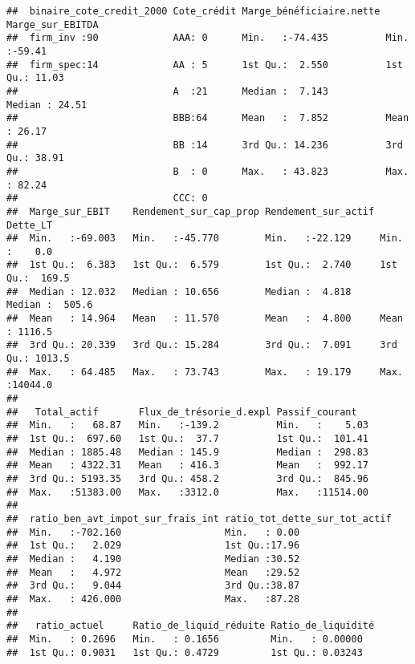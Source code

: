 \documentclass[
]{article}
\begin{document}
\begin{verbatim}
##  binaire_cote_credit_2000 Cote_crédit Marge_bénéficiaire.nette Marge_sur_EBITDA
##  firm_inv :90             AAA: 0      Min.   :-74.435          Min.   :-59.41  
##  firm_spec:14             AA : 5      1st Qu.:  2.550          1st Qu.: 11.03  
##                           A  :21      Median :  7.143          Median : 24.51  
##                           BBB:64      Mean   :  7.852          Mean   : 26.17  
##                           BB :14      3rd Qu.: 14.236          3rd Qu.: 38.91  
##                           B  : 0      Max.   : 43.823          Max.   : 82.24  
##                           CCC: 0                                               
##  Marge_sur_EBIT    Rendement_sur_cap_prop Rendement_sur_actif    Dette_LT      
##  Min.   :-69.003   Min.   :-45.770        Min.   :-22.129     Min.   :    0.0  
##  1st Qu.:  6.383   1st Qu.:  6.579        1st Qu.:  2.740     1st Qu.:  169.5  
##  Median : 12.032   Median : 10.656        Median :  4.818     Median :  505.6  
##  Mean   : 14.964   Mean   : 11.570        Mean   :  4.800     Mean   : 1116.5  
##  3rd Qu.: 20.339   3rd Qu.: 15.284        3rd Qu.:  7.091     3rd Qu.: 1013.5  
##  Max.   : 64.485   Max.   : 73.743        Max.   : 19.179     Max.   :14044.0  
##                                                                                
##   Total_actif       Flux_de_trésorie_d.expl Passif_courant    
##  Min.   :   68.87   Min.   :-139.2          Min.   :    5.03  
##  1st Qu.:  697.60   1st Qu.:  37.7          1st Qu.:  101.41  
##  Median : 1885.48   Median : 145.9          Median :  298.83  
##  Mean   : 4322.31   Mean   : 416.3          Mean   :  992.17  
##  3rd Qu.: 5193.35   3rd Qu.: 458.2          3rd Qu.:  845.96  
##  Max.   :51383.00   Max.   :3312.0          Max.   :11514.00  
##                                                               
##  ratio_ben_avt_impot_sur_frais_int ratio_tot_dette_sur_tot_actif
##  Min.   :-702.160                  Min.   : 0.00                
##  1st Qu.:   2.029                  1st Qu.:17.96                
##  Median :   4.190                  Median :30.52                
##  Mean   :   4.972                  Mean   :29.52                
##  3rd Qu.:   9.044                  3rd Qu.:38.87                
##  Max.   : 426.000                  Max.   :87.28                
##                                                                 
##   ratio_actuel     Ratio_de_liquid_réduite Ratio_de_liquidité
##  Min.   : 0.2696   Min.   : 0.1656         Min.   : 0.00000  
##  1st Qu.: 0.9031   1st Qu.: 0.4729         1st Qu.: 0.03243  

\end{verbatim}
\end{document}
